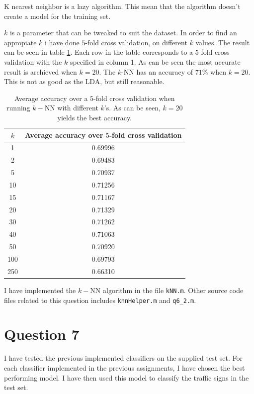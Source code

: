 \documentclass[10pt]{article}
\begin{document}
K nearest neighbor is a lazy algorithm. This mean that the algorithm doesn't create a model for the training set. 

$k$ is a parameter that can be tweaked to suit the dataset. In order to find an appropiate $k$ i have done $5$-fold cross validation, on different $k$ values. The result can be seen in table \ref{table2}. Each row in the table corresponds to a $5$-fold cross validation with the $k$ specified in column 1. As can be seen the most accurate result is archieved when $k=20$. The $k$-NN has an accuracy of $71\%$ when $k=20$. This is not as good as the LDA, but still reasonable. 

\begin{table}
  \begin{center}  
    \begin{tabular}{ | c | c |}
      \hline
      $k$ & Average accuracy over $5$-fold cross validation\\
      \hline
        1    &     0.69996\\
        2    &     0.69483\\
        5    &     0.70937\\
       10    &     0.71256\\
       15    &     0.71167\\
       20    &     0.71329\\
       30    &     0.71262\\
       40    &     0.71063\\
       50    &     0.70920\\
      100    &     0.69793\\
      250    &     0.66310\\        
      \hline
    \end{tabular}
    \caption{Average accuracy over a $5$-fold cross validation when running $k-$NN with different $k$'s. As can be seen, $k=20$ yields the best accuracy.}
    \label{table2}
  \end{center}    
\end{table}   

I have implemented the $k-$NN algorithm in the file \texttt{kNN.m}. Other source code files related to this question includes \texttt{knnHelper.m} and \texttt{q6_2.m}.



\section*{Question 7} %
\label{sec:question_7}
I have tested the previous implemented classifiers on the supplied test set. For each classifier implemented in the previous assignments, I have chosen the best performing model. I have then used this model to classify the traffic signs in the test set.
\end{document}
